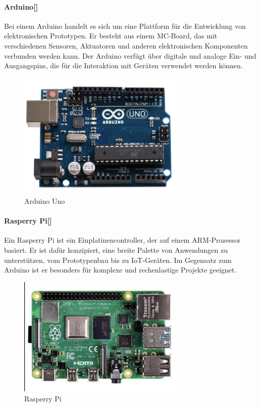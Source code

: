 	\paragraph{Arduino[\cite*[siehe: ]{ArduinoRobotics}]}
	Bei einem Arduino handelt es sich um eine Plattform für die Entwicklung von elektronischen Prototypen. %
	Er besteht aus einem \ac{MC}-Board, das mit verschiedenen Sensoren, Aktuatoren und anderen elektronischen Komponenten verbunden werden kann.
	Der Arduino verfügt über digitale und analoge Ein- und Ausgangspins, die für die Interaktion mit Geräten verwendet werden können.
	\begin{figure}[htbp]
		\centering
		\includegraphics [width=8cm] {img/ArduinoR3}
		\caption{Arduino Uno}
		\label{img:Arduino}
	\end{figure}
\newline

\paragraph{Rasperry Pi[\cite*[siehe: ]{ArduinoVsRaspberry2022}]}
Ein Rasperry Pi ist ein Einplatinencontroller, der auf einem ARM-Prozessor basiert.
Er ist dafür konzipiert, eine breite Palette von Anwendungen zu unterstützen, vom Prototypenbau bis zu IoT-Geräten.
Im Gegensatz zum Arduino ist er besonders für komplexe und rechenlastige Projekte geeignet.
\begin{figure}[htbp]
	\centering
	\includegraphics [width=8cm] {img/RasperryPi}
	\caption{Rasperry Pi}
	\label{img:Raspi}
\end{figure}
\newline

